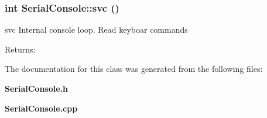 \subsubsection{\setlength{\rightskip}{0pt plus 5cm}int Serial\-Console::svc ()\hspace{0.3cm}{\tt  [virtual]}}\label{classSerialConsole_a2}


svc Internal console loop. Read keyboar commands

\begin{Desc}
\item[Returns:]\end{Desc}


The documentation for this class was generated from the following files:\begin{CompactItemize}
\item 
{\bf Serial\-Console.h}\item 
{\bf Serial\-Console.cpp}\end{CompactItemize}
